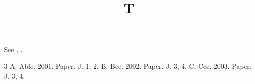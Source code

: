 \documentclass[sigconf]{acmart}
\begin{document}
\title{T}
\maketitle
See \cite{c,a,b}, \cite{b,a}.
\begin{thebibliography}{3}
 A. Able. 2001. Paper. J. 1, 2.
 B. Bee. 2002. Paper. J. 3, 4.
 C. Cee. 2003. Paper. J. 3, 4.
\end{thebibliography}
\end{document}
